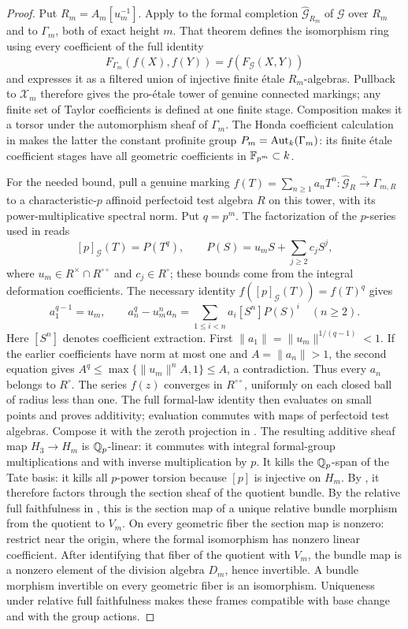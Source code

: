 \begin{proof}
Put $R_m=A_m[u_m^{-1}]$.  Apply
\cite[Theorem~1 and its proof, pp.~1--4]{LurieFormalGroups2010}
to the formal completion $\widehat{\mathcal G}_{R_m}$ of $\mathcal G$
over $R_m$ and to $\Gamma_m$, both of exact height $m$.  That theorem defines the
isomorphism ring using every coefficient of the full identity
\[
 F_{\Gamma_m}(f(X),f(Y))=f(F_{\mathcal G}(X,Y))
\]
and expresses it as a filtered union of injective finite \'etale
$R_m$-algebras.  Pullback to $\mathcal X_m$ therefore gives the
pro-\'etale tower of genuine connected markings; any finite set of
Taylor coefficients is defined at one finite stage.  Composition
makes it a torsor under the automorphism sheaf of $\Gamma_m$.
The Honda coefficient calculation in 
makes the latter the constant profinite group
$P_m=\operatorname{Aut}_k(\Gamma_m)$: its finite \'etale coefficient stages have
all geometric coefficients in $\mathbb F_{p^m}\subset k$.

For the needed bound, pull a genuine marking
$f(T)=\sum_{n\geq1}a_nT^n:\widehat{\mathcal G}_R
\xrightarrow{\sim}\Gamma_{m,R}$ to a characteristic-$p$
affinoid perfectoid test algebra $R$ on this tower, with its
power-multiplicative spectral norm.  Put $q=p^m$.  The factorization
of the $p$-series used in  reads
\[
 [p]_{\mathcal G}(T)=P(T^q),\qquad
 P(S)=u_mS+\sum_{j\geq2}c_jS^j,
\]
where $u_m\in R^\times\cap R^{\circ\circ}$ and $c_j\in R^\circ$;
these bounds come from the integral deformation coefficients.
The necessary identity $f([p]_{\mathcal G}(T))=f(T)^q$ gives
\[
 a_1^{q-1}=u_m,\qquad
 a_n^q-u_m^na_n=\sum_{1\leq i<n}a_i[S^n]P(S)^i
 \quad(n\geq2).
\]
Here $[S^n]$ denotes coefficient extraction.  First
$\|a_1\|=\|u_m\|^{1/(q-1)}<1$.  If the earlier coefficients have
norm at most one and $A=\|a_n\|>1$, the second equation gives
$A^q\leq\max\{\|u_m\|^nA,1\}\leq A$, a contradiction.
Thus every $a_n$ belongs to $R^\circ$.  The series $f(z)$ converges
in $R^{\circ\circ}$, uniformly on each closed ball of radius less
than one.  The full formal-law identity then evaluates on small
points and proves additivity; evaluation commutes with maps of
perfectoid test algebras.  Compose it with the zeroth projection
in .  The resulting additive sheaf map
$H_3\to H_m$ is $\mathbb Q_p$-linear: it commutes with integral
formal-group multiplications and with inverse multiplication
by $p$.  It kills the $\mathbb Q_p$-span of the Tate basis: it kills
all $p$-power torsion because $[p]$ is injective on $H_m$.
By , it
therefore factors through the section sheaf of the quotient bundle.
By the relative full faithfulness in ,
this is the section map of a unique relative bundle morphism
from the quotient to $V_m$.  On every geometric fiber the
section map is nonzero: restrict near the origin, where the
formal isomorphism has nonzero linear coefficient.  After
identifying that fiber of the quotient with $V_m$, the bundle
map is a nonzero element of the division algebra $D_m$, hence
invertible.  A bundle morphism invertible on every geometric
fiber is an isomorphism.  Uniqueness under relative full
faithfulness makes these frames compatible with base change
and with the group actions.


\end{proof}
